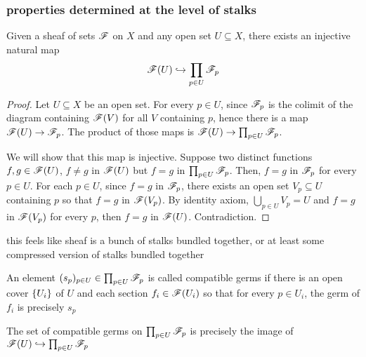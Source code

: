 \subsubsection{properties determined at the level of stalks}

\begin{proposition}
	Given a sheaf of sets $\mathscr{F}$ on $X$ and any open set $U \subseteq X$, there exists an injective natural map
	$$
		\mathscr{F}(U) \hookrightarrow \prod_{p \in U} \mathscr{F}_p
	$$
\end{proposition}

\begin{proof}
	Let $U \subseteq X$ be an open set. For every $p \in U$, since $\mathscr{F}_p$ is the colimit of the diagram containing $\mathscr{F}(V)$ for all $V$ containing $p$, hence there is a map $\mathscr{F}(U) \to \mathscr{F}_p$. The product of those maps is $\mathscr{F}(U) \to \prod_{p \in U} \mathscr{F}_p$.
	
	We will show that this map is injective. Suppose two distinct functions $f, g \in \mathscr{F}(U)$, $f \neq g$ in $\mathscr{F}(U)$ but $f = g$ in $\prod_{p \in U} \mathscr{F}_p$. Then, $f = g$ in $\mathscr{F}_p$ for every $p \in U$. For each $p \in U$, since $f = g$ in $\mathscr{F}_p$, there exists an open set $V_p \subseteq U$ containing $p$ so that $f = g$ in $\mathscr{F}(V_p)$. By identity axiom, $\bigcup_{p \in U} V_p = U$ and $f = g$ in $\mathscr{F}(V_p)$ for every $p$, then $f = g$ in $\mathscr{F}(U)$. Contradiction.
\end{proof}

\begin{remark}
	this feels like sheaf is a bunch of stalks bundled together, or at least some compressed version of stalks bundled together
\end{remark}

\begin{definition}
	An element $(s_p)_{p \in U} \in \prod_{p \in U} \mathscr{F}_p$ is called compatible germs if there is an open cover $\{U_i\}$ of $U$ and each section $f_i \in \mathscr{F}(U_i)$ so that for every $p \in U_i$, the germ of $f_i$ is precisely $s_p$
\end{definition}

\begin{proposition}
	The set of compatible germs on $\prod_{p \in U} \mathscr{F}_p$ is precisely the image of $\mathscr{F}(U) \hookrightarrow \prod_{p \in U} \mathscr{F}_p$
\end{proposition}

